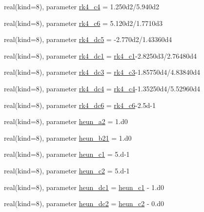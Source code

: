 \begin{DoxyCompactItemize}
\item 
real(kind=8), parameter \hyperlink{namespacerk4__coms_ae29e60a0912723f4124b219bb67135d8}{rk4\+\_\+c4} = 1.\+250d2/5.\+940d2
\item 
real(kind=8), parameter \hyperlink{namespacerk4__coms_a50aa680b806d041ad4b2d83b838ce6e4}{rk4\+\_\+c6} = 5.\+120d2/1.\+7710d3
\item 
real(kind=8), parameter \hyperlink{namespacerk4__coms_aa2ab2d5fa0e976ca56e10da08c4409a6}{rk4\+\_\+dc5} = -\/2.\+770d2/1.\+43360d4
\item 
real(kind=8), parameter \hyperlink{namespacerk4__coms_a8f2ecc1ddfd20579092c340f3cde39b4}{rk4\+\_\+dc1} = \hyperlink{namespacerk4__coms_a1dd142bdfa35986937ac4396a759dda0}{rk4\+\_\+c1}-\/2.\+8250d3/2.\+76480d4
\item 
real(kind=8), parameter \hyperlink{namespacerk4__coms_ad50fbfa221dd0da30f0c1f4bbc5d4f3e}{rk4\+\_\+dc3} = \hyperlink{namespacerk4__coms_a94a604a5d0d271bf875f0fd3338fef3e}{rk4\+\_\+c3}-\/1.\+85750d4/4.\+83840d4
\item 
real(kind=8), parameter \hyperlink{namespacerk4__coms_a1bb5b9bcaddfd294bf37a8ea838adf3f}{rk4\+\_\+dc4} = \hyperlink{namespacerk4__coms_ae29e60a0912723f4124b219bb67135d8}{rk4\+\_\+c4}-\/1.\+35250d4/5.\+52960d4
\item 
real(kind=8), parameter \hyperlink{namespacerk4__coms_abf3a30685db4e4c9f6cd9f903eb1a2fd}{rk4\+\_\+dc6} = \hyperlink{namespacerk4__coms_a50aa680b806d041ad4b2d83b838ce6e4}{rk4\+\_\+c6}-\/2.\+5d-\/1
\item 
real(kind=8), parameter \hyperlink{namespacerk4__coms_a87d69315c8ce5a8eece7631c044e56e5}{heun\+\_\+a2} = 1.d0
\item 
real(kind=8), parameter \hyperlink{namespacerk4__coms_ae8d76c010784094c3299f39f54d015c1}{heun\+\_\+b21} = 1.d0
\item 
real(kind=8), parameter \hyperlink{namespacerk4__coms_aacfe35ff98522754e71ad11a44b521b4}{heun\+\_\+c1} = 5.d-\/1
\item 
real(kind=8), parameter \hyperlink{namespacerk4__coms_afad602ec1632d28447fa784393dd4777}{heun\+\_\+c2} = 5.d-\/1
\item 
real(kind=8), parameter \hyperlink{namespacerk4__coms_aeea9fe3a451738a304eacef0dfa174a1}{heun\+\_\+dc1} = \hyperlink{namespacerk4__coms_aacfe35ff98522754e71ad11a44b521b4}{heun\+\_\+c1} -\/ 1.d0
\item 
real(kind=8), parameter \hyperlink{namespacerk4__coms_ad638286586253a3741b0fd05bd2456a3}{heun\+\_\+dc2} = \hyperlink{namespacerk4__coms_afad602ec1632d28447fa784393dd4777}{heun\+\_\+c2} -\/ 0.d0

\end{DoxyCompactItemize}
